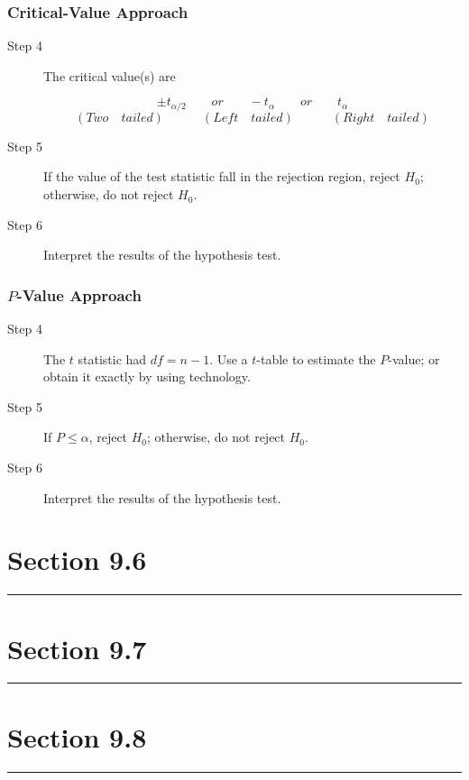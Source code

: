 \documentclass[12pt]{article}
\begin{document}
            \subsubsection*{Critical-Value Approach}
                \begin{description}
                    \item[Step 4] The critical value(s) are
                    \begin{center}
                        \[
                            \pm t_{\alpha/2} \quad\quad or \quad\quad -t_{\alpha} \quad\quad or
                            \quad\quad t_{\alpha}    
                        \]
                        \[
                            (Two \quad tailed)\quad\quad\quad(Left \quad tailed)\quad\quad\quad
                            (Right \quad tailed)
                        \]
                    \end{center} 
                    \item[Step 5] If the value of the test statistic fall in the rejection
                    region, reject $H_0$; otherwise, do not reject $H_0$. 
                    \item[Step 6] Interpret the results of the hypothesis test.
                \end{description}
            \subsubsection*{$P$-Value Approach}
                \begin{description}
                    \item[Step 4] The $t$ statistic had $df = n-1$. Use a $t$-table to
                    estimate the $P$-value; or obtain it exactly by using technology.
                    \item[Step 5] If $P \leq \alpha$, reject $H_0$; otherwise, do not
                    reject $H_0$.  
                    \item[Step 6] Interpret the results of the hypothesis test.
                \end{description}

    \section*{Section 9.6}
    \noindent\rule{\textwidth}{0.4pt}


    \section*{Section 9.7}
    \noindent\rule{\textwidth}{0.4pt}


    \section*{Section 9.8}
    \noindent\rule{\textwidth}{0.4pt}
\end{document}
